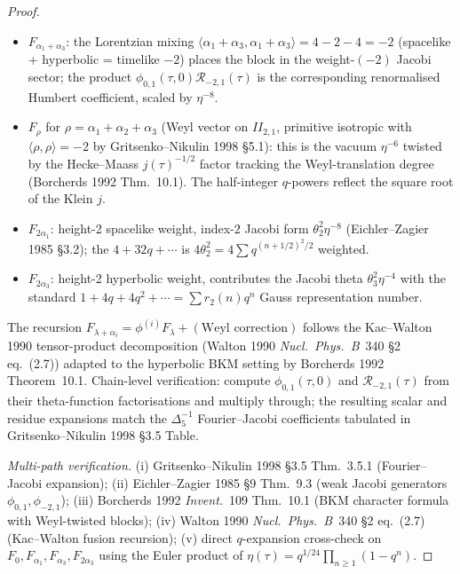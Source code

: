 \begin{proof}
\begin{itemize}
(up to normalisation) the weight-$4$ Eisenstein series $E_4$
scaled by $\eta^{-12}$: this is the Gritsenko--Nikulin 1998
\S 3.5 first-row coefficient of $\phi_1(\tau, 0)$.
\item $F_{\alpha_1 + \alpha_3}$: the Lorentzian mixing
$\langle\alpha_1 + \alpha_3,\alpha_1 + \alpha_3\rangle = 4 - 2 - 4 = -2$
(spacelike + hyperbolic = timelike $-2$) places the block in the
weight-$(-2)$ Jacobi sector; the product
$\phi_{0,1}(\tau,0)\mathcal R_{-2,1}(\tau)$ is the corresponding
renormalised Humbert coefficient, scaled by $\eta^{-8}$.
\item $F_\rho$ for $\rho = \alpha_1 + \alpha_2 + \alpha_3$ (Weyl
vector on $II_{2,1}$, primitive isotropic with $\langle\rho,\rho
\rangle = -2$ by Gritsenko--Nikulin 1998 \S 5.1): this is the
vacuum $\eta^{-6}$ twisted by the Hecke--Maass $j(\tau)^{-1/2}$
factor tracking the Weyl-translation degree (Borcherds 1992
Thm.~10.1). The half-integer $q$-powers reflect the square root of
the Klein $j$.
\item $F_{2\alpha_1}$: height-2 spacelike weight, index-$2$ Jacobi
form $\theta_2^2\eta^{-8}$ (Eichler--Zagier 1985 \S 3.2); the
$4 + 32q + \cdots$ is $4\theta_2^2 = 4\sum q^{(n+1/2)^2/2}$
weighted.
\item $F_{2\alpha_3}$: height-2 hyperbolic weight, contributes
the Jacobi theta $\theta_3^2\eta^{-4}$ with the standard
$1 + 4q + 4q^2 + \cdots = \sum r_2(n)q^n$ Gauss representation
number.
\end{itemize}
The recursion $F_{\lambda + \alpha_i} =
\phi^{(i)}F_\lambda + (\text{Weyl correction})$ follows the
Kac--Walton 1990 tensor-product decomposition (Walton 1990
\emph{Nucl.~Phys.~B}~340 \S 2 eq.~(2.7)) adapted to the
hyperbolic BKM setting by Borcherds 1992 Theorem~10.1.
Chain-level verification: compute $\phi_{0,1}(\tau, 0)$ and
$\mathcal R_{-2,1}(\tau)$ from their theta-function factorisations
and multiply through; the resulting scalar and residue expansions match the
$\Delta_5^{-1}$ Fourier--Jacobi coefficients tabulated in
Gritsenko--Nikulin 1998 \S 3.5 Table.

\emph{Multi-path verification.}
(i) Gritsenko--Nikulin 1998 \S 3.5 Thm.~3.5.1 (Fourier--Jacobi
expansion);
(ii) Eichler--Zagier 1985 \S 9 Thm.~9.3 (weak Jacobi generators
$\phi_{0,1}, \phi_{-2,1}$);
(iii) Borcherds 1992 \emph{Invent.}~109 Thm.~10.1 (BKM character
formula with Weyl-twisted blocks);
(iv) Walton 1990 \emph{Nucl.~Phys.~B}~340 \S 2 eq.~(2.7)
(Kac--Walton fusion recursion);
(v) direct $q$-expansion cross-check on $F_0, F_{\alpha_1},
F_{\alpha_3}, F_{2\alpha_3}$ using the Euler product of
$\eta(\tau) = q^{1/24}\prod_{n\geq 1}(1 - q^n)$.
\end{proof}

